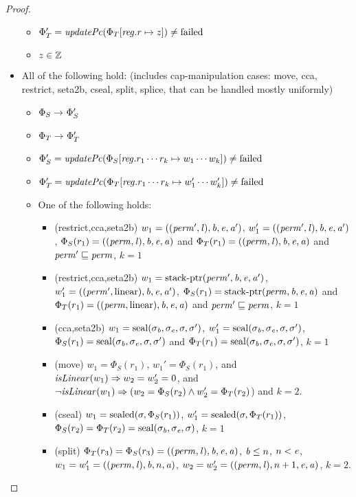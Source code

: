 \begin{proof}
\begin{itemize}
\begin{itemize}
  \item $\Phi_T' = \updPcAddr{\Phi_T\updReg{r}{z}} \neq \failed$
  \item $z \in \mathbb{Z}$
  \end{itemize}
\item All of the following hold: (includes cap-manipulation cases: move, cca, restrict, seta2b, cseal, split, splice, that can be handled mostly uniformly)
  \begin{itemize}
  \item $\Phi_S \rightarrow^{} \Phi_S'$
  \item $\Phi_T \rightarrow^{} \Phi_T'$
  \item $\Phi_S' = \updPcAddr{\Phi_S\updReg{r_1\cdots r_k}{w_1\cdots w_k}}\neq \failed$
  \item $\Phi_T' = \updPcAddr{\Phi_T\updReg{r_1\cdots r_k}{w_1'\cdots w_k'}} \neq \failed$
  \item One of the following holds:
    \begin{itemize}
    \item (restrict,cca,seta2b) $w_1 = ((\mathit{perm}',\mathit{l}),\mathit{b},\mathit{e},\mathit{a}')$, $w_1' = ((\mathit{perm}',\mathit{l}),\mathit{b},\mathit{e},\mathit{a}')$, $\Phi_S(r_1) = ((\mathit{perm},\mathit{l}),\mathit{b},\mathit{e},\mathit{a})$ and $\Phi_T(r_1) = ((\mathit{perm},\mathit{l}),\mathit{b},\mathit{e},\mathit{a})$ and $\mathit{perm}' \sqsubseteq\mathit{perm}$, $k = 1$
    \item (restrict,cca,seta2b) $w_1 = \mathrm{stack\text{-}ptr}(\mathit{perm}',\mathit{b},\mathit{e},\mathit{a}')$, $w_1' = ((\mathit{perm}',\mathrm{linear}),\mathit{b},\mathit{e},\mathit{a}')$, $\Phi_S(r_1) = \mathrm{stack\text{-}ptr}(\mathit{perm},\mathit{b},\mathit{e},\mathit{a})$ and $\Phi_T(r_1) = ((\mathit{perm},\mathrm{linear}),\mathit{b},\mathit{e},\mathit{a})$ and $\mathit{perm}' \sqsubseteq\mathit{perm}$, $k = 1$
    \item (cca,seta2b) $w_1 = \mathrm{seal}(\sigma_{\mathit{b}},\sigma_{\mathit{e}},\sigma,\sigma')$, $w_1' = \mathrm{seal}(\sigma_{\mathit{b}},\sigma_{\mathit{e}},\sigma,\sigma')$, $\Phi_S(r_1) = \mathrm{seal}(\sigma_{\mathit{b}},\sigma_{\mathit{e}},\sigma,\sigma')$ and $\Phi_T(r_1) = \mathrm{seal}(\sigma_{\mathit{b}},\sigma_{\mathit{e}},\sigma,\sigma')$, $k = 1$
    \item (move) $w_1 = \Phi_S(r_1)$, $w_1' = \Phi_S(r_1)$, and
      $\isLinear{w_1} \Rightarrow w_2 = w_2' = 0$, and $\neg
      \isLinear{w_1} \Rightarrow (w_2 = \Phi_S(r_2) \wedge w_2' = \Phi_T(r_2)$)
      and $k = 2$.
    \item (cseal) $w_1 = \mathrm{sealed}(\sigma,\Phi_S(r_1))$, $w_1' = \mathrm{sealed}(\sigma,\Phi_T(r_1))$, $\Phi_S(r_2) = \Phi_T(r_2) = \mathrm{seal}(\sigma_{\mathit{b}},\sigma_{\mathit{e}},\sigma)$, $k=1$
    \item (split) $\Phi_T(r_3) = \Phi_S(r_3) = ((\mathit{perm},\mathit{l}),\mathit{b},\mathit{e},\mathit{a})$, $\mathit{b} \leq n$, $n < \mathit{e}$, $w_1 = w_1' = ((\mathit{perm},\mathit{l}),\mathit{b},n,\mathit{a})$, $w_2 = w_2' = ((\mathit{perm},\mathit{l}),n+1,\mathit{e},\mathit{a})$, $k=2$.

\end{itemize}
\end{itemize}
\end{itemize}
\end{proof}
